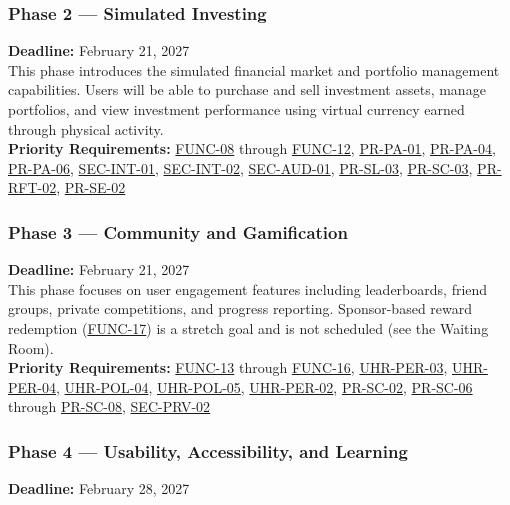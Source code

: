 \documentclass[12pt]{article}
\begin{document}
\subsubsection{Phase 2 --- Simulated Investing} 
\noindent\textbf{Deadline:} February 21, 2027 \\

This phase introduces the simulated financial market and portfolio management capabilities. Users will be able to purchase and sell investment assets, manage portfolios, and view investment performance using virtual currency earned through physical activity. \\

\noindent\textbf{Priority Requirements:} \hyperlink{req:FUNC-08}{FUNC-08} through \hyperlink{req:FUNC-12}{FUNC-12}, \hyperlink{req:PR-PA-01}{PR-PA-01}, \hyperlink{req:PR-PA-04}{PR-PA-04}, \hyperlink{req:PR-PA-06}{PR-PA-06}, \hyperlink{req:SEC-INT-01}{SEC-INT-01}, \hyperlink{req:SEC-INT-02}{SEC-INT-02}, \hyperlink{req:SEC-AUD-01}{SEC-AUD-01}, \hyperlink{req:PR-SL-03}{PR-SL-03}, \hyperlink{req:PR-SC-03}{PR-SC-03}, \hyperlink{req:PR-RFT-02}{PR-RFT-02}, \hyperlink{req:PR-SE-02}{PR-SE-02}

\subsubsection{Phase 3 --- Community and Gamification} 
\noindent\textbf{Deadline:} February 21, 2027 \\

This phase focuses on user engagement features including leaderboards, friend groups, private competitions, and progress reporting. Sponsor-based reward redemption (\hyperlink{req:FUNC-17}{FUNC-17}) is a stretch goal and is not scheduled (see the Waiting Room). \\

\noindent\textbf{Priority Requirements:} \hyperlink{req:FUNC-13}{FUNC-13} through \hyperlink{req:FUNC-16}{FUNC-16}, \hyperlink{req:UHR-PER-03}{UHR-PER-03}, \hyperlink{req:UHR-PER-04}{UHR-PER-04}, \hyperlink{req:UHR-POL-04}{UHR-POL-04}, \hyperlink{req:UHR-POL-05}{UHR-POL-05}, \hyperlink{req:UHR-PER-02}{UHR-PER-02}, \hyperlink{req:PR-SC-02}{PR-SC-02}, \hyperlink{req:PR-SC-06}{PR-SC-06} through \hyperlink{req:PR-SC-08}{PR-SC-08}, \hyperlink{req:SEC-PRV-02}{SEC-PRV-02}

\subsubsection{Phase 4 --- Usability, Accessibility, and Learning} 
\noindent\textbf{Deadline:} February 28, 2027 \\
\end{document}

